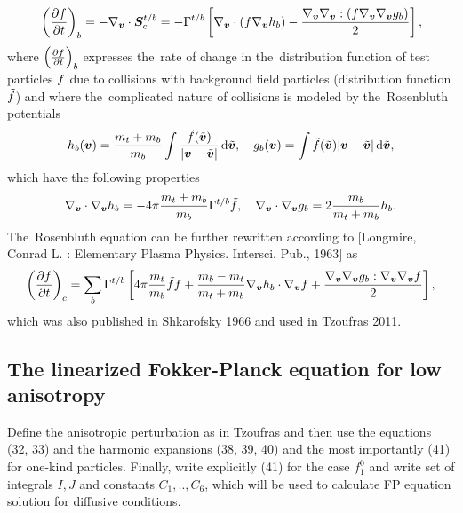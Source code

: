 \begin{equation}
  \left(\frac{\partial{f}}{\partial{t}}\right)_{b} = - \nabla_{\boldsymbol{v}} \cdot \boldsymbol{S}_c^{t/b} = 
  - \Gamma^{t/b} \left[ \nabla_{\boldsymbol{v}}\cdot\left(f \nabla_{\boldsymbol{v}}h_{b}\right)
  - \frac{\nabla_{\boldsymbol{v}}\nabla_{\boldsymbol{v}}:\left(f \nabla_{\boldsymbol{v}}\nabla_{\boldsymbol{v}}g_{b} \right)}{2}\right] ,
  \label{eq:FP_Rosenbluth}
\end{equation}
where $\left(\frac{\partial{f}}{\partial{t}}\right)_{b}$ expresses the~rate of change in 
the~distribution function of test particles $f$ due to collisions with
background field particles (distribution function $\tilde{f}$) and
where the~complicated nature of collisions is modeled by the~Rosenbluth 
potentials 
\begin{equation}
  h_{b}(\boldsymbol{v}) = \frac{m_t + m_b}{m_b}
  \int \frac{\tilde{f}(\tilde{\boldsymbol{v}})}{|\boldsymbol{v} - \tilde{\boldsymbol{v}}|}\, \text{d}\tilde{\boldsymbol{v}} ,
  \quad g_{b}(\boldsymbol{v}) = \int \tilde{f}(\tilde{\boldsymbol{v}})|\boldsymbol{v} - \tilde{\boldsymbol{v}}|\, \text{d}\tilde{\boldsymbol{v}} ,
  \nonumber
\end{equation}
which have the following properties
\begin{equation}
  \nabla_{\boldsymbol{v}}\cdot\nabla_{\boldsymbol{v}} h_{b} = 
  -4\pi \frac{m_t + m_b}{m_b} \Gamma^{t/b}\tilde{f} ,\quad
  \nabla_{\boldsymbol{v}}\cdot\nabla_{\boldsymbol{v}} g_{b} = 
  2 \frac{m_b}{m_t + m_b} h_{b} .
  \nonumber
\end{equation}
The~Rosenbluth equation  can be further rewritten
according to $[$Longmire, Conrad L. : Elementary Plasma Physics. Intersci. Pub., 1963$]$ as
\begin{equation}
  \left(\frac{\partial{f}}{\partial{t}}\right)_c = \sum_{b} \Gamma^{t/b} 
  \left[ 4\pi \frac{m_{t}}{m_b} \tilde{f} f 
  + \frac{m_b - m_t}{m_t + m_b} \nabla_{\boldsymbol{v}}h_{b}\cdot\nabla_{\boldsymbol{v}} f 
  + \frac{\nabla_{\boldsymbol{v}}\nabla_{\boldsymbol{v}}g_{b} : \nabla_{\boldsymbol{v}}\nabla_{\boldsymbol{v}} f}{2} \right] ,
  \label{eq:FP_Longmire}
\end{equation}
which was also published in Shkarofsky 1966 and used in Tzoufras 2011.


\subsection{The linearized Fokker-Planck equation for low anisotropy}
\label{sec:FP_linear}
Define the anisotropic perturbation as in Tzoufras and then use the equations
(32, 33) and the harmonic expansions (38, 39, 40) and the most importantly (41)
for one-kind particles. Finally, write explicitly (41) for the case $f_1^0$
and write set of integrals $I, J$ and constants $C_1, .., C_6$,
which will be used to calculate FP equation solution for diffusive conditions.

